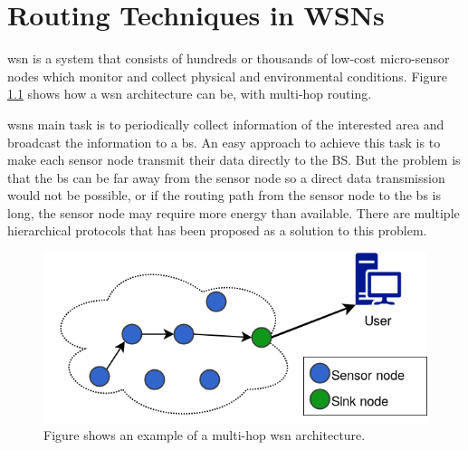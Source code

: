\documentclass[USenglish]{uit-thesis}
\newcommand{\definition}[1]{%
  \refstepcounter{definition}%
  \par\noindent\textbf{The Definition~\thedefinition. #1}%
  \addcontentsline{def}{definition}
    {\protect\numberline{\thechapter.\thedefinition}#1}\par%
}
\begin{document}









\chapter{Routing Techniques in WSNs}
\glsresetall
\gls{wsn} is a system that consists of hundreds or thousands of low-cost micro-sensor nodes which monitor and collect physical and environmental conditions. Figure \ref{fig:wsn} shows how a \gls{wsn} architecture can be, with multi-hop routing. 


\gls{wsn}s  main task is to periodically collect information of the interested area and broadcast the information to a \gls{bs}. An easy approach to achieve this task is to make each sensor node transmit their data directly to the BS. But the problem is that the \gls{bs} can be far away from the sensor node so a direct data transmission would not be possible, or if the routing path from the sensor node to the \gls{bs} is long, the sensor node may require more energy than available. There are multiple hierarchical protocols that has been proposed as a solution to this problem.

\begin{figure} [!ht]
\centering
\includegraphics[width=\textwidth]{wsn.png}
\caption{Figure shows an example of a multi-hop \gls{wsn} architecture.}
\label{fig:wsn}
\end{figure}
\end{document}

